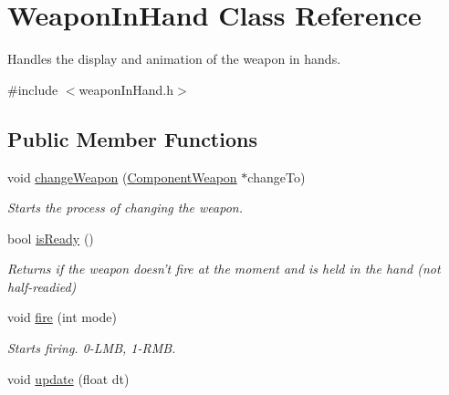 \hypertarget{classWeaponInHand}{
\section{\-Weapon\-In\-Hand \-Class \-Reference}
\label{dc/d08/classWeaponInHand}
}


\-Handles the display and animation of the weapon in hands.  




{\ttfamily \#include $<$weapon\-In\-Hand.\-h$>$}

\subsection*{\-Public \-Member \-Functions}
\begin{DoxyCompactItemize}
\item 
\hypertarget{classWeaponInHand_a0e844c4b0589d42c70dda2acf8bf292c}{
void \hyperlink{classWeaponInHand_a0e844c4b0589d42c70dda2acf8bf292c}{change\-Weapon} (\hyperlink{classComponentWeapon}{\-Component\-Weapon} $\ast$change\-To)}
\label{dc/d08/classWeaponInHand_a0e844c4b0589d42c70dda2acf8bf292c}

\begin{DoxyCompactList}\small\item\em \-Starts the process of changing the weapon. \end{DoxyCompactList}\item 
\hypertarget{classWeaponInHand_a7fbad04e01f13105cc8d5409893eb404}{
bool \hyperlink{classWeaponInHand_a7fbad04e01f13105cc8d5409893eb404}{is\-Ready} ()}
\label{dc/d08/classWeaponInHand_a7fbad04e01f13105cc8d5409893eb404}

\begin{DoxyCompactList}\small\item\em \-Returns if the weapon doesn't fire at the moment and is held in the hand (not half-\/readied) \end{DoxyCompactList}\item 
\hypertarget{classWeaponInHand_a841607071276193c0f67596f17a26257}{
void \hyperlink{classWeaponInHand_a841607071276193c0f67596f17a26257}{fire} (int mode)}
\label{dc/d08/classWeaponInHand_a841607071276193c0f67596f17a26257}

\begin{DoxyCompactList}\small\item\em \-Starts firing. 0-\/\-L\-M\-B, 1-\/\-R\-M\-B. \end{DoxyCompactList}\item 
\hypertarget{classWeaponInHand_af2de44e6c86743086d2c091e2de5e173}{
void \hyperlink{classWeaponInHand_af2de44e6c86743086d2c091e2de5e173}{update} (float dt)}
\label{dc/d08/classWeaponInHand_af2de44e6c86743086d2c091e2de5e173}


\end{DoxyCompactItemize}
